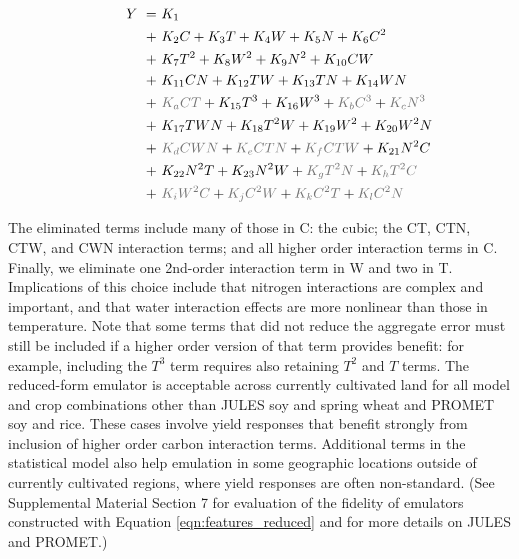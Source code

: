 \documentclass[gmd, manuscript]{copernicus} %
\begin{document}
\vspace{-0.35in}
\begin{align}
        \hspace{10mm} \label{eqn:features_reduced}
    Y\ = \ & K_{1}  \\
    + \ & K_{2} C      + K_{3} T       + K_{4} W    + K_{5} N  + K_{6} C^2 \nonumber \\
    + \ & K_{7} T^2    + K_{8} W^2     + K_{9} N^2  + K_{10} C W \nonumber \\
    + \ & K_{11} C N   + K_{12} T W    + K_{13} T N + K_{14} W N \nonumber \\
    + \ & {\color{dark-gray}K_{a} C T} + K_{15} T^3 + K_{16} W^3  + {\color{dark-gray}K_{b} C^3} + {\color{dark-gray}K_{c} N^3}\nonumber \\
    + \ & K_{17} T W N + K_{18} T^2 W  + K_{19} W^2 + K_{20} W^2 N  \nonumber \\
    + \ & {\color{dark-gray}K_{d} C W N} + {\color{dark-gray}K_{e} C T N} + {\color{dark-gray}K_{f} C T W} + K_{21} N^2 C \nonumber \\
    + \ & K_{22} N^2 T + K_{23} N^2 W    + {\color{dark-gray}K_{g} T^2 N} + {\color{dark-gray}K_{h} T^2 C}                 \nonumber \\
    + \ & {\color{dark-gray}K_{i} W^2 C} + {\color{dark-gray}K_{j} C^2 W} + {\color{dark-gray}K_{k} C^2 T} + {\color{dark-gray}K_{l} C^2 N} \nonumber
\end{align}

\noindent The eliminated terms include many of those in C: the cubic; the CT, CTN, CTW, and CWN interaction terms; and all higher order interaction terms in C. 
Finally, we eliminate one 2nd-order interaction term in W and two in T. 
Implications of this choice include that nitrogen interactions are complex and important, and that water interaction effects are more nonlinear than those in temperature.  
Note that some terms that did not reduce the aggregate error must still be included if a higher order version of that term provides benefit: for example, including the $T^3$ term requires also retaining $T^2$ and $T$ terms. 
The reduced-form emulator is acceptable across currently cultivated land for all model and crop combinations other than JULES soy and spring wheat and PROMET soy and rice.
These cases involve yield responses that benefit strongly from inclusion of higher order carbon interaction terms. 
Additional terms in the statistical model also help emulation in some geographic locations outside of currently cultivated regions, where yield responses are often non-standard. 
(See Supplemental Material Section 7 for evaluation of the fidelity of emulators constructed with Equation \ref{eqn:features_reduced} and for more details on JULES and PROMET.)
\end{document}
